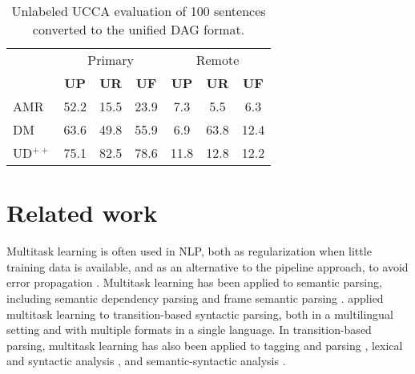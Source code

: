 \documentclass[11pt,a4paper]{article}
\begin{document}
\begin{table}
\begin{tabular}{lccc|ccc}
& \multicolumn{3}{c|}{\footnotesize Primary} & \multicolumn{3}{c}{\footnotesize Remote} \\
& \footnotesize \textbf{UP} & \footnotesize \textbf{UR} & \footnotesize \textbf{UF}
& \footnotesize \textbf{UP} & \footnotesize \textbf{UR} & \footnotesize \textbf{UF} \\
AMR & 52.2 & 15.5 & 23.9 & 7.3 & 5.5 & 6.3 \\
DM & 63.6 & 49.8 & 55.9 & 6.9 & 63.8 & 12.4 \\
UD$^{++}$ & 75.1 & 82.5 & 78.6 & 11.8 & 12.8 & 12.2
\end{tabular}
\caption{Unlabeled UCCA evaluation of 100 sentences converted to the unified DAG format.
\label{tab:common}}
\end{table}



\section{Related work}\label{sec:related_work}


Multitask learning is often used in NLP, both as regularization when little training data is available,
and as an alternative to the pipeline approach, to avoid error propagation
\cite{collobert2008unified}.
Multitask learning has been applied to semantic parsing, including
semantic dependency parsing \cite{P17-1186} and
frame semantic parsing \cite{swayamdipta2017frame}.
\citet{guo2016exploiting} applied multitask learning to transition-based
syntactic parsing,
both in a multilingual setting and with multiple formats in a single language.
In transition-based parsing, multitask learning has also been applied to
tagging and parsing \cite{bohnet2012transition,Zhang2016StackpropagationIR},
lexical and syntactic analysis \cite{constant-nivre:2016:P16-1,more2016joint},
and semantic-syntactic analysis \cite{swayamdipta-EtAl:2016:CoNLL,henderson2013multilingual}.
\end{document}

